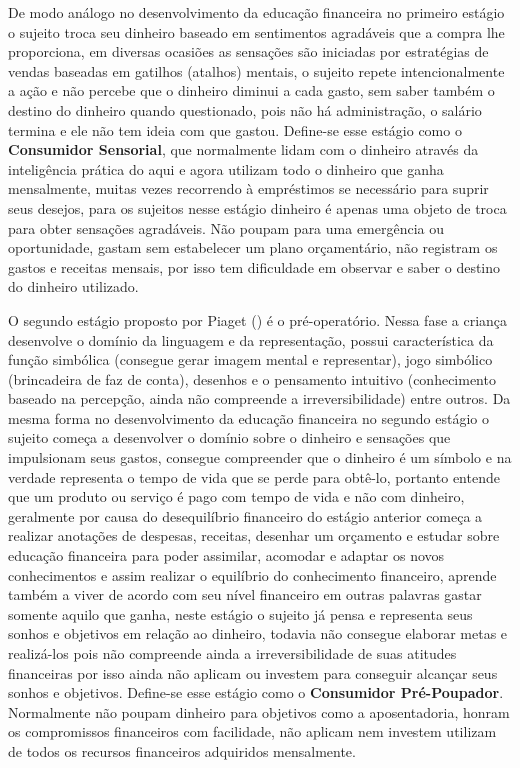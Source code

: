 De modo análogo no desenvolvimento da educação financeira no primeiro estágio o sujeito troca seu dinheiro baseado em sentimentos agradáveis que a compra lhe proporciona, em diversas ocasiões as sensações são iniciadas por estratégias de vendas baseadas em gatilhos (atalhos) mentais, o sujeito repete intencionalmente a ação e não percebe que o dinheiro diminui a cada gasto, sem saber também o destino do dinheiro quando questionado, pois não há administração, o salário termina e ele não tem ideia com que gastou. Define-se esse estágio como o \textbf{Consumidor Sensorial}, que normalmente lidam com o dinheiro através da inteligência prática do aqui e agora utilizam todo o dinheiro que ganha mensalmente, muitas vezes recorrendo à empréstimos se necessário para suprir seus desejos, para os sujeitos nesse estágio dinheiro é apenas uma objeto de troca para obter sensações agradáveis. Não poupam para uma emergência ou oportunidade, gastam sem estabelecer um plano orçamentário, não registram os gastos e receitas mensais, por isso tem dificuldade em observar e saber o destino do dinheiro utilizado.

O segundo estágio proposto por Piaget (\citeyear{piaget1971}) é o pré-operatório. Nessa fase a criança desenvolve o domínio da linguagem e da representação, possui característica da função simbólica (consegue gerar imagem mental e representar), jogo simbólico (brincadeira de faz de conta), desenhos e o pensamento intuitivo (conhecimento baseado na percepção, ainda não compreende a irreversibilidade) entre outros. Da mesma forma no desenvolvimento da educação financeira no segundo estágio o sujeito começa a desenvolver o domínio sobre o dinheiro e sensações que impulsionam seus gastos, consegue compreender que o dinheiro é um símbolo e na verdade representa o tempo de vida que se perde para obtê-lo, portanto entende que um produto ou serviço é pago com tempo de vida e não com dinheiro, geralmente por causa do desequilíbrio financeiro do estágio anterior começa a realizar anotações de despesas, receitas, desenhar um orçamento e estudar sobre educação financeira para poder assimilar, acomodar e adaptar os novos conhecimentos e assim realizar o equilíbrio do conhecimento financeiro, aprende também a viver de acordo com seu nível financeiro em outras palavras gastar somente aquilo que ganha, neste estágio o sujeito já pensa e representa seus sonhos e objetivos em relação ao dinheiro, todavia não consegue elaborar metas e realizá-los pois não compreende ainda a irreversibilidade de suas atitudes financeiras por isso ainda não aplicam ou investem para conseguir alcançar seus sonhos e objetivos. Define-se esse estágio como o \textbf{Consumidor Pré-Poupador}. Normalmente não poupam dinheiro para objetivos como a aposentadoria, honram os compromissos financeiros com facilidade, não aplicam nem investem utilizam de todos os recursos financeiros adquiridos mensalmente.

